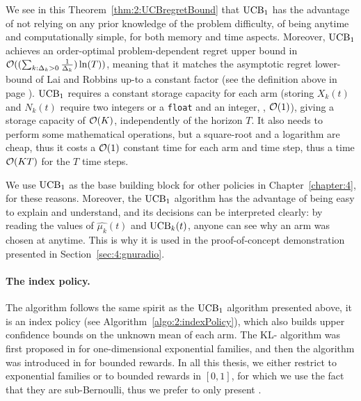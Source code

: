 We see in this Theorem~\ref{thm:2:UCBregretBound} that $\mathrm{UCB}_1$ has the advantage of not relying on any prior knowledge of the problem difficulty, of being anytime and computationally simple, for both memory and time aspects.
Moreover, $\mathrm{UCB}_1$ achieves an order-optimal problem-dependent regret upper bound in $\mathcal{O}((\sum_{k: \Delta_k>0} \frac{1}{\Delta_k})\ln(T))$, meaning that it matches the asymptotic regret lower-bound of Lai and Robbins up-to a constant factor \cite{LaiRobbins85} (see the definition above in page \pageref{par:2:def_optimal_orderoptimal}).
%
$\mathrm{UCB}_1$ requires a constant storage capacity for each arm (storing $X_k(t)$ and $N_k(t)$ require two integers or a \texttt{float} and an integer, \ie, $\mathop{}\mathopen{}\mathcal{O}\mathopen{}\left(1\right)$), giving a storage capacity of $\mathop{}\mathopen{}\mathcal{O}\mathopen{}\left(K\right)$, independently of the horizon $T$.
It also needs to perform some mathematical operations, but a square-root and a logarithm are cheap, thus it costs a $\mathop{}\mathopen{}\mathcal{O}\mathopen{}\left(1\right)$ constant time for each arm and time step, thus a time $\mathop{}\mathopen{}\mathcal{O}\mathopen{}\left(K T\right)$ for the $T$ time steps.

We use $\mathrm{UCB}_1$ as the base building block for other policies in Chapter~\ref{chapter:4}, for these reasons.
Moreover, the $\mathrm{UCB}_1$ algorithm has the advantage of being easy to explain and understand, and its decisions can be interpreted clearly: by reading the values of $\widehat{\mu_k}(t)$ and $\mathrm{UCB}_k(t)$, anyone can see why an arm was chosen at anytime.
This is why it is used in the proof-of-concept demonstration presented in Section~\ref{sec:4:gnuradio}.


\paragraph{The \klUCB{} index policy.}
%
The \klUCB{} algorithm follows the same spirit as the $\mathrm{UCB}_1$ algorithm presented above,
it is an index policy (see Algorithm~\ref{algo:2:indexPolicy}),
which also builds upper confidence bounds on the unknown mean of each arm.
The KL-\UCB{} algorithm was first proposed in \cite{Garivier11KL} for one-dimensional exponential families,
and then the \klUCB{} algorithm was introduced in \cite{KLUCBJournal} for bounded rewards.
In all this thesis, we either restrict to exponential families or to bounded rewards in $[0,1]$, for which we use the fact that they are sub-Bernoulli, thus we prefer to only present \klUCB.

